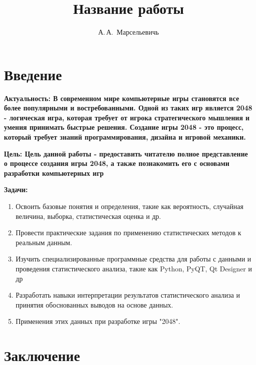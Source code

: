 \documentclass[14pt, oneside]{altsu-report}
\title{Название работы}
\author{А.\,А.~Марсельевичь}
\institute{Институт цифровых технологий, электроники и физики}
\date{\the\year}
\begin{document}
\maketitle

\setcounter{page}{2}
\makeabstract
\tableofcontents

\chapter*{Введение}

\textbf{Актуальность:
В современном мире компьютерные игры становятся все более популярными и востребованными. Одной из таких игр является 2048 - логическая игра, которая требует от игрока стратегического мышления и умения принимать быстрые решения. Создание игры 2048 - это процесс, который требует знаний программирования, дизайна и игровой механики.}

\textbf{Цель:
Цель данной работы - предоставить читателю полное представление о процессе создания игры 2048, а также познакомить его с основами разработки компьютерных игр}

\textbf{Задачи:}
\begin{enumerate}
\item  Освоить базовые понятия и определения, такие как вероятность, случайная величина, выборка, статистическая оценка и др.
\item Провести практические задания по применению статистических методов к реальным данным.
\item Изучить специализированные программные средства для работы с данными и проведения статистического анализа, такие как  Python, PyQT, Qt Designer и др
\item Разработать навыки интерпретации результатов статистического анализа и принятия обоснованных выводов на основе данных.
\item Применения этих данных при разработке игры "2048".
\end{enumerate}





\chapter*{Заключение}
\end{document}

